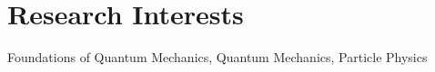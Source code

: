 \section{Research Interests}
\large
Foundations of Quantum Mechanics, Quantum Mechanics, Particle Physics